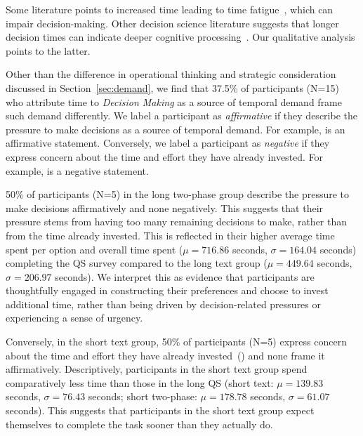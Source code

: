 Some literature points to increased time leading to time fatigue~\cite{}, which can impair decision-making. Other decision science literature suggests that longer decision times can indicate deeper cognitive processing~\cite{payneAdaptiveDecisionMaker1993}. Our qualitative analysis points to the latter.

Other than the difference in operational thinking and strategic consideration discussed in Section~\ref{sec:demand}, we find that 37.5\% of participants (N=15) who attribute time to \textit{Decision Making} as a source of temporal demand frame such demand differently. We label a participant as \textit{affirmative} if they describe the pressure to make decisions as a source of temporal demand. For example,  is an affirmative statement. Conversely, we label a participant as \textit{negative} if they express concern about the time and effort they have already invested. For example,  is a negative statement.

50\% of participants (N=5) in the long two-phase group describe the pressure to make decisions affirmatively and none negatively. This suggests that their pressure stems from having too many remaining decisions to make, rather than from the time already invested. This is reflected in their higher average time spent per option and overall time spent ($\mu=716.86$ seconds, $\sigma=164.04$ seconds) completing the QS survey compared to the long text group ($\mu=449.64$ seconds, $\sigma=206.97$ seconds). We interpret this as evidence that participants are thoughtfully engaged in constructing their preferences and choose to invest additional time, rather than being driven by decision-related pressures or experiencing a sense of urgency.

Conversely, in the short text group, 50\% of participants (N=5) express concern about the time and effort they have already invested~() and none frame it affirmatively. Descriptively, participants in the short text group spend comparatively less time than those in the long QS (short text: $\mu=139.83$ seconds, $\sigma=76.43$ seconds; short two-phase: $\mu=178.78$ seconds, $\sigma=61.07$ seconds). This suggests that participants in the short text group expect themselves to complete the task sooner than they actually do. 

